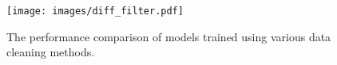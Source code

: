 \begin{figure}[!htb]
    \centering
    \texttt{[image: images/diff\_filter.pdf]}
    \caption{\label{fig:diff_filter}
    The performance comparison of models trained using various data cleaning methods.
    }
\end{figure}
